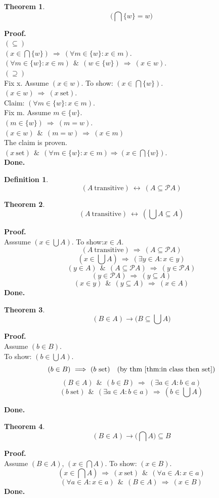 \documentclass[10pt,a4paper]{article}
\theoremstyle{definition}
\newtheorem{definition}{Definition}[section]
\newtheorem{theorem}{Theorem}[section]
\newcommand{\AND}{\ \ \&\ \ }
\newcommand{\Done}{\noindent \textbf{Done.}\\}
\renewcommand{\iff}{\ \longleftrightarrow\ }
\newcommand{\IMPLIES}{\ \Longrightarrow\ }
\newcommand{\intersection}{\bigcap}
\newcommand{\power}{\mathcal{P}}
\newcommand{\Proof}{\noindent \textbf{Proof.}\\}
\newcommand{\set}{\mathrm{\ set}}
\newcommand{\transitive}{\mathrm{\ transitive}}
\newcommand{\union}{\bigcup}
\begin{document}
\begin{theorem}
\[\big(\intersection\{w\}=w\big)\]
\end{theorem}
\Proof
$(\subseteq)$\\
$(x\in\intersection \{w\})\IMPLIES(\forall m\in\{w\}:x\in m)$.\\
$(\forall m\in\{w\}:x\in m)\AND(w\in \{w\})\IMPLIES(x\in w).$\\
$(\supseteq)$\\
Fix x. Assume $(x\in w)$. To show: $(x\in\intersection\{w\})$.\\
$(x\in w)\IMPLIES(x\set)$.\\
Claim: $(\forall m\in\{w\}:x\in m).$\\
Fix m. Assume $m\in\{w\}$.\\
$(m\in\{w\})\IMPLIES(m=w)$.\\
$(x\in w)\AND(m=w)\IMPLIES(x\in m)$\\
The claim is proven.\\
$(x\set)\AND(\forall m\in\{w\}:x\in m) \Longrightarrow (x\in\intersection\{w\}).$\\
\Done

\begin{definition}
\label{def:transitive through power}
\[
(A \transitive)\iff (A\subseteq \power A)
\]
\end{definition}
\begin{theorem}
\label{thm:transitive through union}
\[
(A \transitive)\iff (\union A\subseteq A)
\]
\end{theorem}
\Proof
Asssume $(x\in\union A)$. To show:$x\in A$.
\[
(A \transitive)
\IMPLIES
(A\subseteq \power A)
\]
\[
(x\in\union A)
\IMPLIES
(\exists y\in A: x\in y)
\]
\[
(y\in A)
\AND
(A\subseteq \power A)
\IMPLIES
(y\in \power A)
\]
\[
(y\in \power A)
\IMPLIES
(y\subseteq A)
\]
\[
(x\in y)
\AND
(y\subseteq A)
\IMPLIES
(x\in A)
\]
\Done
\begin{theorem}
\[
(B\in A) \rightarrow \big(B \subseteq \union A\big)
\]
\end{theorem}
\Proof
Assume $(b\in B)$.\\
To show: $(b\in \union A)$.\\
\[
(b\in B)
\IMPLIES
(b\set)
\quad\mbox{(by thm \ref{thm:in class then set})}
\]
\[
(B\in A)
\AND
(b\in B)
\IMPLIES
(\exists a\in A : b\in a)
\]
\[
(b\set)
\AND
(\exists a\in A : b\in a)
\IMPLIES
(b\in \union A)
\]

\Done

\begin{theorem}
\[
(B\in A) \rightarrow \big(\intersection A\big)\subseteq B
\]
\end{theorem}
\Proof
Assume $(B\in A)$, $(x\in \intersection A)$. To show: $(x\in B)$.
\[
(x\in \intersection A)
\IMPLIES
(x\set)
\AND
(\forall a\in A : x\in a)
\]
\[
(\forall a\in A : x\in a)
\AND
(B\in A)
\IMPLIES
(x\in B)
\]
\Done
\end{document}

